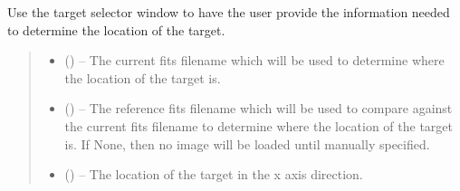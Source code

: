\documentclass[letterpaper,11pt,english]{sphinxmanual}
\begin{document}
\begin{savenotes}
\begin{fulllineitems}
\end{fulllineitems}\end{savenotes}


\begin{savenotes}\begin{fulllineitems}
\label{\detokenize{code/opihiexarata.gui.selector:opihiexarata.gui.selector.ask_user_target_selector_window}}
\pysigstartsignatures
{}
\pysigstopsignatures
\sphinxAtStartPar
Use the target selector window to have the user provide the
information needed to determine the location of the target.
\begin{quote}\begin{description}
\begin{itemize}
\item {} 
\sphinxAtStartPar
{} () – The current fits filename which will be used to determine where the
location of the target is.

\item {} 
\sphinxAtStartPar
{} (\sphinxstyleliteralemphasis{\sphinxupquote{, }}) – The reference fits filename which will be used to compare against the
current fits filename to determine where the location of the target
is. If None, then no image will be loaded until manually specified.

\end{itemize}

\sphinxAtStartPar
\begin{itemize}
\item {} 
\sphinxAtStartPar
{} () – The location of the target in the x axis direction.


\end{itemize}
\end{description}
\end{quote}
\end{fulllineitems}
\end{savenotes}
\end{document}
